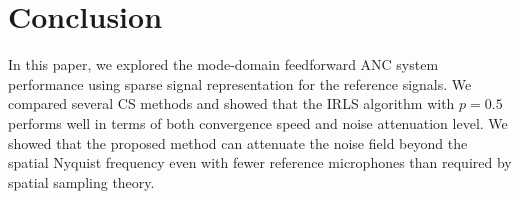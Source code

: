 \documentclass{article}
\begin{document}
\section{Conclusion}
\label{sec:conclusion}
%
In this paper, we explored the mode-domain feedforward ANC system performance using sparse signal representation for the reference signals.
We compared several CS methods and showed that the IRLS algorithm with $p=0.5$ performs well in terms of both convergence speed and noise attenuation level.
We showed that the proposed method can attenuate the noise field beyond the spatial Nyquist frequency even with fewer reference microphones than required by spatial sampling theory.


%
%
%
%






%
\end{document}
